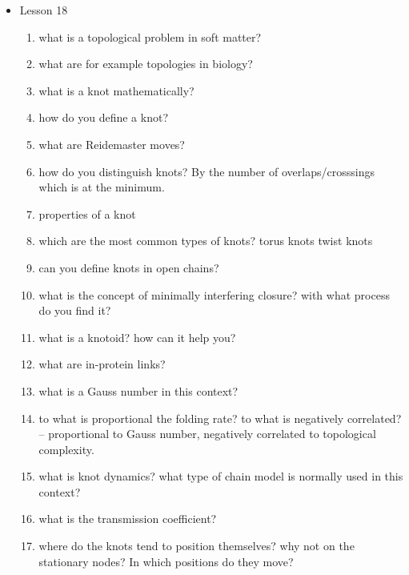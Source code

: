 {\begin{itemize}
\begin{enumerate}
        \item what is the kremer-grest model?
        \item how can you evaluate the stiffness of a polymer?
        \item main characteristics of DNA
        \item what is oxDNA
        \item what are the resolutions types used on the base of the length wanted
        \item what is a crumpled globule model?
    \end{enumerate}
    \item Lesson 18
    \begin{enumerate}
        \item what is a topological problem in soft matter?
        \item what are for example topologies in biology?
        \item what is a knot mathematically?
        \item how do you define a knot?
        \item what are Reidemaster moves?
        \item how do you distinguish knots? By the number of overlaps/crosssings which is at the minimum.
        \item properties of a knot
        \item which are the most common types of knots? torus knots twist knots
        \item can you define knots in open chains?
        \item what is the concept of minimally interfering closure? with what process do you find it?
        \item what is a knotoid? how can it help you?
        \item what are in-protein links?
        \item what is a Gauss number in this context?
        \item to what is proportional the folding rate? to what is negatively correlated? -- proportional to Gauss number, negatively correlated to topological complexity.
        \item what is knot dynamics? what type of chain model is normally used in this context?
        \item what is the transmission coefficient?
        \item where do the knots tend to position themselves? why not on the stationary nodes? In which positions do they move? 

\end{enumerate}
\end{itemize}}
